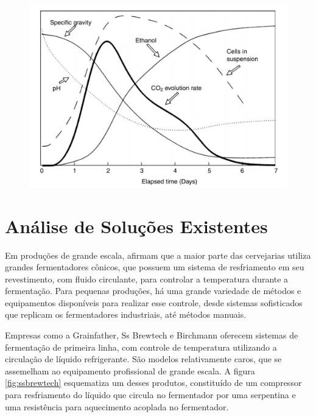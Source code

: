 \begin{figure}[H]
    \centering
    \includegraphics[scale=0.40]{figuras/contexto/variaveis_fermentacao.PNG}
    \label{fig:variaveis_fermentacao}
\end{figure}

\section{Análise de Soluções Existentes}


Em produções de grande escala,  afirmam que a maior parte das cervejarias utiliza grandes fermentadores cônicos, que possuem um sistema de resfriamento em seu revestimento, com fluido circulante, para controlar a temperatura durante a fermentação. Para pequenas produções, há uma grande variedade de métodos e equipamentos disponíveis para realizar esse controle, desde sistemas sofisticados que replicam os fermentadores industriais, até métodos manuais.


Empresas como a Grainfather, Ss Brewtech e Birchmann oferecem sistemas de fermentação de primeira linha, com controle de temperatura utilizando a circulação de líquido refrigerante. São modelos relativamente caros, que se assemelham ao equipamento profissional de grande escala. A figura \ref{fig:ssbrewtech} esquematiza um desses produtos, constituído de um compressor para resfriamento do líquido que circula no fermentador por uma serpentina e uma resistência para aquecimento acoplada no fermentador.

